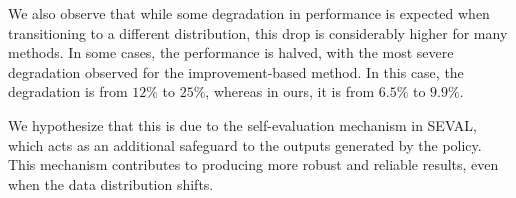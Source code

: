 We also observe that while some degradation in performance is expected when transitioning to a different distribution, this drop is considerably higher for many methods. In some cases, the performance is halved, with the most severe degradation observed for the improvement-based method. In this case, the degradation is from \(12\%\) to \(25\%\), whereas in ours, it is from \(6.5\%\) to \(9.9\%\).

We hypothesize that this is due to the self-evaluation mechanism in SEVAL, which acts as an additional safeguard to the outputs generated by the policy. This mechanism contributes to producing more robust and reliable results, even when the data distribution shifts.
 
